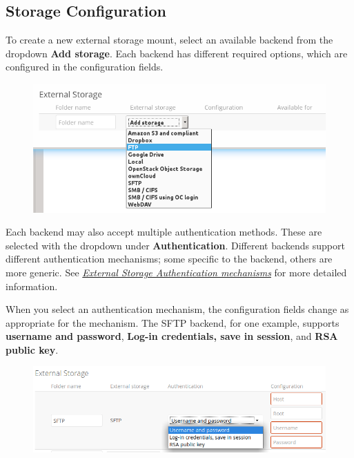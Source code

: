 \documentclass[letterpaper,10pt,english]{sphinxmanual}
\begin{document}
\subsection{Storage Configuration}
\label{configuration_files/external_storage_configuration_gui:storage-configuration}
To create a new external storage mount, select an available backend from the
dropdown \textbf{Add storage}. Each backend has different required options, which
are configured in the configuration fields.
\begin{figure}[htbp]
\centering

\includegraphics{add_storage.png}
\end{figure}

Each backend may also accept multiple authentication methods. These are selected
with the dropdown under \textbf{Authentication}. Different backends support different
authentication mechanisms; some specific to the backend, others are more
generic. See {\hyperref[configuration_files/external_storage/auth_mechanisms::doc]{\emph{External Storage Authentication mechanisms}}} for more detailed
information.

When you select an authentication mechanism, the configuration fields change as
appropriate for the mechanism. The SFTP backend, for one example, supports
\textbf{username and password}, \textbf{Log-in credentials, save in session}, and \textbf{RSA
public key}.
\begin{figure}[htbp]
\centering

\includegraphics{auth_mechanism.png}
\end{figure}
\end{document}

